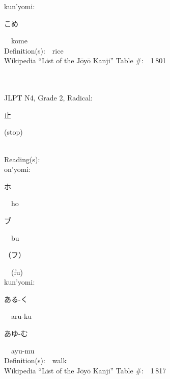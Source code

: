 \begin{multicols}{2}
{\hspace*{1em}}kun'yomi:\ \ \\
{\hspace*{2em}}{\begin{CJK}{UTF8}{min} こめ \end{CJK}}\ \ kome\ \ \\
Definition(s):\ \ rice \\
Wikipedia ``List of the J\=oy\=o Kanji'' Table \#:\ \ 1\,801 \\
\ \ \\
{\fontsize{34pt}{40pt}  }\ \ \\  %
{JLPT N4, Grade 2, Radical:\ \ {\begin{CJK}{UTF8}{min} 止 \end{CJK}} (stop) } \\
Reading(s):\ \ \\
{\hspace*{1em}}on'yomi:\ \ \\
{\hspace*{2em}}{\begin{CJK}{UTF8}{min} ホ \end{CJK}}\ \ ho\ \ \\
{\hspace*{2em}}{\begin{CJK}{UTF8}{min} ブ \end{CJK}}\ \ bu\ \ \\
{\hspace*{2em}}{\begin{CJK}{UTF8}{min} （フ） \end{CJK}}\ \ (fu)\ \ \\
{\hspace*{1em}}kun'yomi:\ \ \\
{\hspace*{2em}}{\begin{CJK}{UTF8}{min} ある-く \end{CJK}}\ \ aru-ku\ \ \\
{\hspace*{2em}}{\begin{CJK}{UTF8}{min} あゆ-む \end{CJK}}\ \ ayu-mu\ \ \\
Definition(s):\ \ walk \\
Wikipedia ``List of the J\=oy\=o Kanji'' Table \#:\ \ 1\,817 \\

\end{multicols}
